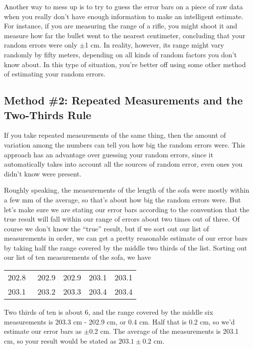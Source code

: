 	Another way to mess up is to try to guess the error bars on
a piece of raw data when you really don't have enough
information to make an intelligent estimate. For instance,
if you are measuring the range of a rifle, you might shoot
it and measure how far the bullet went to the nearest
centimeter, concluding that your random errors were only $\pm$1
cm. In reality, however, its range might vary randomly by
fifty meters, depending on all kinds of random factors you
don't know about. In this type of situation, you're better
off using some other method of estimating your random errors.

\subsection*{Method \#2: Repeated Measurements and the Two-Thirds Rule}

	If you take repeated measurements of the same thing, then
the amount of variation among the numbers can tell you how
big the random errors were. This approach has an advantage
over guessing your random errors, since it automatically
takes into account all the sources of random error, even
ones you didn't know were present. 

	Roughly speaking, the measurements of the length of the
sofa were mostly within a few mm of the average, so that's
about how big the random errors were. But let's make sure we
are stating our error bars according to the convention that
the true result will fall within our range of errors about
two times out of three. Of course we don't know the ``true''
result, but if we sort out our list of measurements in
order, we can get a pretty reasonable estimate of our error
bars by taking half the range covered by the middle two
thirds of the list. Sorting out our list of ten measurements
of the sofa, we have

\begin{tabular}{lllll}
	202.8\ \zu{cm} &	202.9&	202.9&	203.1&	203.1\\
	203.1	&203.2 &	203.3&	203.4	&203.4\\
\end{tabular}

Two thirds of ten is about 6, and the range covered by the
middle six measurements is 203.3 cm - 202.9 cm, or 0.4 cm.
Half that is 0.2 cm, so we'd estimate our error bars as $\pm$0.2
cm. The average of the measurements is 203.1 cm, so your
result would be stated as $203.1\pm0.2$ cm.

